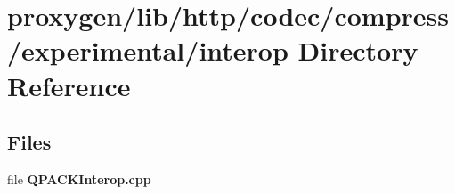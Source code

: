 \section{proxygen/lib/http/codec/compress/experimental/interop Directory Reference}
\label{dir_1b3226226ba19edb48f0f53a7a70a04d}
\subsection*{Files}
\begin{DoxyCompactItemize}
\item 
file {\bf Q\+P\+A\+C\+K\+Interop.\+cpp}
\end{DoxyCompactItemize}
